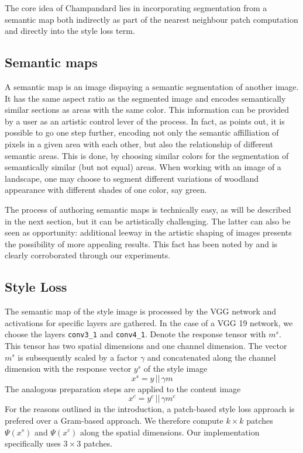 The core idea of Champandard lies in incorporating segmentation from a semantic map both indirectly as part of the nearest neighbour patch computation and directly into the style loss term.

\subsection{Semantic maps}

A semantic map is an image dispaying a semantic segmentation of another image. It has the same aspect ratio as the segmented image and encodes semantically similar sections as areas with the same color. This information can be provided by a user as an artistic control lever of the process. In fact, as \cite{doodles2016} points out, it is possible to go one step further, encoding not only the semantic affilliation of pixels in a given area with each other, but also the relationship of different semantic areas. This is done, by choosing similar colors for the segmentation of semantically similar (but not equal) areas. When working with an image of a landscape, one may choose to segment different variations of woodland appearance with different shades of one color, say green.

The process of authoring semantic maps is technically easy, as will be described in the next section, but it can be artistically challenging. The latter can also be seen as opportunity: additional leeway in the artistic shaping of images presents the possibility of more appealing results. This fact has been noted by \cite{doodles2016} and is clearly corroborated through our experiments.

\subsection{Style Loss}

The semantic map of the style image is processed by the VGG network and activations for specific layers are gathered. In the case of a VGG 19 network, we choose the layers \texttt{conv3\_1} and \texttt{conv4\_1}. Denote the response tensor with \(m^s\). This tensor has two spatial dimensions and one channel dimension. The vector \(m^s\) is subsequently scaled by a factor \(\gamma\) and concatenated along the channel dimension with the response vector \(y^s\) of the style image
\[x^s = y \,||\,\gamma m \]
The analogous preparation steps are applied to the content image
\[x^c = y^c \,||\,\gamma m^c \]
For the reasons outlined in the introduction, a patch-based style loss approach is prefered over a Gram-based approach. We therefore compute \(k\times k\) patches \(\Psi (x^s)\) and \(\Psi (x^c)\) along the spatial dimensions. Our implementation specifically uses \(3\times 3\) patches. 

